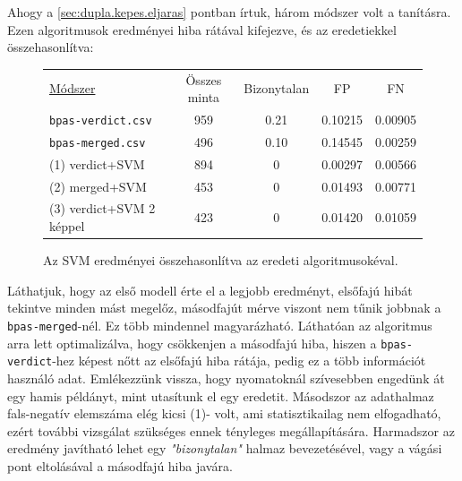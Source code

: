 %
Ahogy a \ref{sec:dupla.kepes.eljaras} pontban írtuk, három módszer volt a tanításra.
Ezen algoritmusok eredményei hiba rátával kifejezve, és az eredetiekkel összehasonlítva:

\begin{figure}[h!]
	\centering
	\begin{tabular}{ l c c c c }
		\underline{Módszer} 		& Összes minta 	& Bizonytalan	& FP	& FN \\
		\texttt{bpas-verdict.csv}\footnotemark[\value{footnote}] 	& 959 			& 0.21			& 0.10215 	& 0.00905 	\\
		\texttt{bpas-merged.csv}\footnotemark[\value{footnote}] 	& 496			& 0.10			& 0.14545 	& 0.00259   \\
		
		\hline
		(1) verdict+SVM					& 894			& 0				& 0.00297	& 0.00566	\\
		(2) merged+SVM					& 453			& 0				& 0.01493	& 0.00771	\\
		(3) verdict+SVM 2 képpel		& 423			& 0				& 0.01420	& 0.01059   \\
		
	\end{tabular}

	\caption{Az SVM eredményei összehasonlítva az eredeti algoritmusokéval.}

\end{figure}







Láthatjuk, hogy az első modell érte el a legjobb eredményt, elsőfajú hibát tekintve minden mást megelőz, 
másodfajút mérve viszont nem tűnik jobbnak a \texttt{bpas-merged}-nél. Ez több mindennel magyarázható.
Láthatóan az algoritmus arra lett optimalizálva, hogy csökkenjen a másodfajú hiba, hiszen a 
\texttt{bpas-verdict}-hez képest nőtt az elsőfajú hiba rátája, pedig ez a több információt használó adat.
Emlékezzünk vissza, hogy nyomatoknál szívesebben engedünk át egy hamis példányt, mint utasítunk
el egy eredetit. Másodszor az adathalmaz fals-negatív elemszáma elég kicsi (1)- volt, ami 
statisztikailag nem elfogadható, ezért további vizsgálat szükséges ennek tényleges megállapítására.
Harmadszor az eredmény javítható lehet egy \textit{"bizonytalan"} halmaz bevezetésével, vagy 
a vágási pont eltolásával a másodfajú hiba javára.


